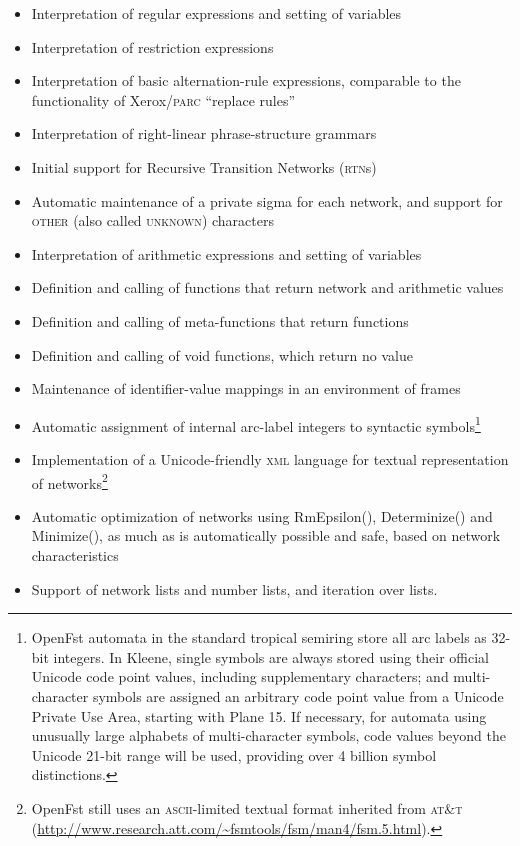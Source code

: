 \documentclass[letterpaper,12pt]{article}
\newcommand{\Kleene}{Kleene\xspace}
\newcommand{\acro}{\textsc}
\begin{document}
\begin{itemize}
\item
Interpretation of regular expressions and setting of variables
\item
Interpretation of restriction expressions
\item
Interpretation of basic alternation-rule expressions, comparable to
the functionality of Xerox/\acro{parc} ``replace rules''
\item
Interpretation of right-linear phrase-structure grammars
\item
Initial support for Recursive Transition Networks (\acro{rtn}s)
\item
Automatic maintenance of a private sigma for each network, and support
for \acro{other} (also called \acro{unknown}) characters
\item
Interpretation of arithmetic expressions and setting of variables
\item
Definition and calling of functions that return network and arithmetic values
\item
Definition and calling of meta-functions that return functions
\item
Definition and calling of void functions, which return no value
\item
Maintenance of identifier-value mappings in an environment of frames
\item
Automatic assignment of internal arc-label integers to syntactic
symbols\footnote{OpenFst automata in the standard tropical
semiring
store all arc labels as 32-bit integers.  In \Kleene{}, single symbols are always stored using their
official Unicode code point values, including supplementary characters; and
multi-character symbols are assigned an arbitrary code point value from
a Unicode Private Use Area, starting with Plane 15.  If necessary, for
automata using unusually
large alphabets of multi-character symbols, code values beyond the Unicode
21-bit range will be used, providing over 4 billion symbol distinctions.}
\item
Implementation of a Unicode-friendly \acro{xml} language for textual representation of
networks\footnote{OpenFst still uses an \acro{ascii}-limited textual format inherited from
\acro{at\&t} (\url{http://www.research.att.com/~fsmtools/fsm/man4/fsm.5.html}).}
\item
Automatic optimization of networks using RmEpsilon(), Determinize() and Minimize(), as much
as is automatically possible and safe, based on network characteristics
\item
Support of network lists and number lists, and iteration over lists.
\end{itemize}
\end{document}
